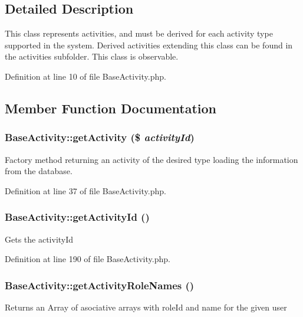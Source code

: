 \subsection{Detailed Description}
This class represents activities, and must be derived for each activity type supported in the system. Derived activities extending this class can be found in the activities subfolder. This class is observable. 



Definition at line 10 of file Base\-Activity.php.

\subsection{Member Function Documentation}
\subsubsection{\setlength{\rightskip}{0pt plus 5cm}Base\-Activity::get\-Activity (\$ {\em activity\-Id})}\label{classBaseActivity_a2}


Factory method returning an activity of the desired type loading the information from the database. 

Definition at line 37 of file Base\-Activity.php.
\subsubsection{\setlength{\rightskip}{0pt plus 5cm}Base\-Activity::get\-Activity\-Id ()}\label{classBaseActivity_a17}


Gets the activity\-Id 

Definition at line 190 of file Base\-Activity.php.
\subsubsection{\setlength{\rightskip}{0pt plus 5cm}Base\-Activity::get\-Activity\-Role\-Names ()}\label{classBaseActivity_a4}


Returns an Array of asociative arrays with role\-Id and name for the given user 

